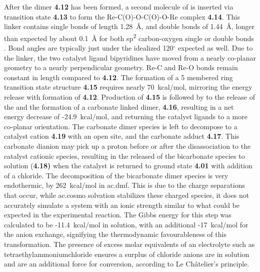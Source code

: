 After the dimer \textbf{4.12} has been formed, a second molecule of  is inserted via transition state \textbf{4.13} to form the Re-C(O)-O-C(O)-O-Re complex \textbf{4.14}. This  linker contains  single bonds of length 1.28~\r{A}, and  double bonds of 1.44~\r{A}, longer than expected by about 0.1~\r{A} for both sp\textsuperscript{2} carbon-oxygen single or double bonds \autocite{crc1998}. Bond angles are typically just under the idealized 120$^\circ$ expected as well. Due to the linker, the two catalyst ligand bipyridines have moved from a nearly co-planar geometry to a nearly perpendicular geometry. Re-C and Re-O bonds remain constant in length compared to \textbf{4.12}. The formation of a 5 membered ring transition state structure \textbf{4.15} requires nearly 70~kcal/mol, mirroring the energy release with formation of \textbf{4.12}. Production of \textbf{4.15} is followed by to the release of the  and the formation of a carbonate linked dimer, \textbf{4.16}, resulting in a net energy decrease of -24.9~kcal/mol, and returning the catalyst ligands to a more co-planar orientation. The carbonate dimer species is left to decompose to a catalyst cation \textbf{4.19} with an open site, and the carbonate adduct \textbf{4.17}. This carbonate dianion may pick up a proton before or after the disassociation to the catalyst cationic species, resulting in the released of the bicarbonate species to solution (\textbf{4.18)} when the catalyst is returned to ground state \textbf{4.01} with addition of a chloride. The decomposition of the bicarbonate dimer species is very endothermic, by 262~kcal/mol in \gls{ac.dmf}. This is due to the charge separations that occur, while \gls{ac.cosmo} solvation stabilizes these charged species, it does not accurately simulate a system with an ionic strength similar to what could be expected in the experimental reaction. The Gibbs energy for this step was calculated to be -11.4~kcal/mol in solution, with an additional -17~kcal/mol for the anion exchange, signifying the thermodynamic favourableness of this transformation. The presence of excess molar equivalents of an electrolyte such as tetraethylammoniumchloride ensures a surplus of chloride anions are in solution and are an additional force for conversion, according to Le Ch\^{a}telier's principle.

